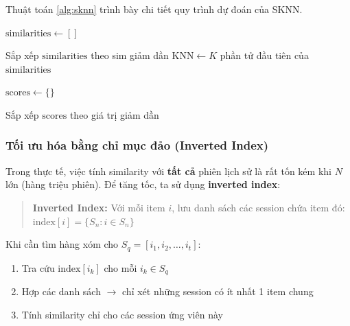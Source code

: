 \documentclass[12pt, a4paper]{article}
\begin{document}
Thuật toán \ref{alg:sknn} trình bày chi tiết quy trình dự đoán của SKNN.

\begin{algorithm}[H]
\SetAlgoLined
{}

\BlankLine
{}
$\text{similarities} \leftarrow []$\;

\BlankLine
{}
Sắp xếp $\text{similarities}$ theo sim giảm dần\;
$\text{KNN} \leftarrow K$ phần tử đầu tiên của $\text{similarities}$\;

\BlankLine
{}
$\text{scores} \leftarrow \{\}$ 

\BlankLine
{}
Sắp xếp $\text{scores}$ theo giá trị giảm dần\;

\caption{SKNN -- dự đoán bằng hàng xóm phiên gần nhất}
\label{alg:sknn}
\end{algorithm}

\subsubsection{Tối ưu hóa bằng chỉ mục đảo (Inverted Index)}

Trong thực tế, việc tính similarity với \textbf{tất cả} phiên lịch sử là rất tốn kém khi $N$ lớn (hàng triệu phiên). Để tăng tốc, ta sử dụng \textbf{inverted index}:

\begin{quote}
\textbf{Inverted Index:} Với mỗi item $i$, lưu danh sách các session chứa item đó: $\text{index}[i] = \{S_n : i \in S_n\}$
\end{quote}

Khi cần tìm hàng xóm cho $S_q = [i_1, i_2, \ldots, i_t]$:
\begin{enumerate}
    \item Tra cứu $\text{index}[i_k]$ cho mỗi $i_k \in S_q$
    \item Hợp các danh sách $\rightarrow$ chỉ xét những session có ít nhất 1 item chung
    \item Tính similarity chỉ cho các session ứng viên này
\end{enumerate}
\end{document}
